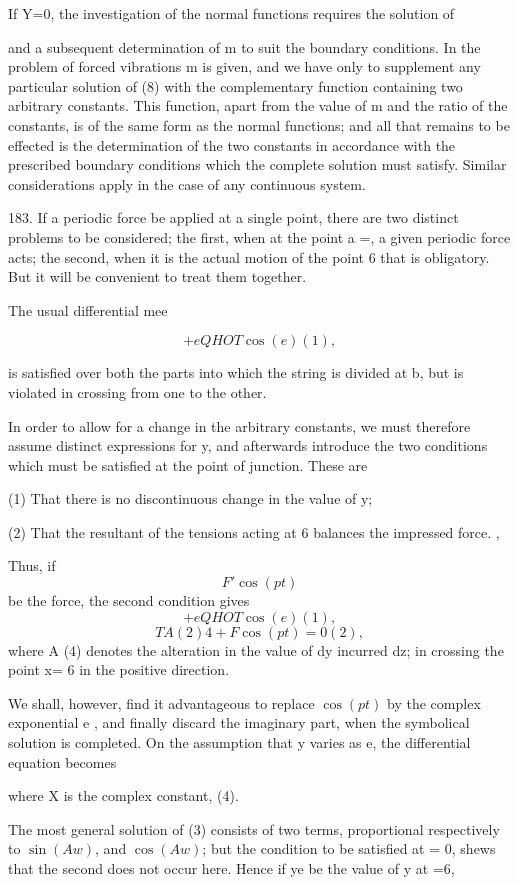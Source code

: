 If Y=0, the investigation of the normal functions requires the solution of

and a subsequent determination of m to suit the boundary conditions. In the
problem of forced vibrations m is given, and we have only to supplement any
particular solution of (8) with the complementary function containing two
arbitrary constants. This function, apart from the value of m and the ratio of
the constants, is of the same form as the normal functions; and all that
remains to be effected is the determination of the two constants in accordance
with the prescribed boundary conditions which the complete solution must
satisfy. Similar considerations apply in the case of any continuous system.

183. If a periodic force be applied at a single point, there are two distinct
problems to be considered; the first, when at the point a =, a given periodic
force acts; the second, when it is the actual motion of the point 6 that is
obligatory. But it will be convenient to treat them together.

The usual differential mee

\[+eQ HOT \cos(e) (1),\]

is satisfied over both the parts into which the string is divided at b, but is
violated in crossing from one to the other.

In order to allow for a change in the arbitrary constants, we must therefore
assume distinct expressions for y, and afterwards introduce the two conditions
which must be satisfied at the point of junction.  These are

(1) That there is no discontinuous change in the value of y;

(2) That the resultant of the tensions acting at 6 balances the impressed
force. ,

Thus, if
\[F' \cos(pt)\]
be the force, the second condition gives
\[+eQ HOT \cos(e) (1),\]
\[TA (2) 4+ F \cos(pt) = 0  (2),\]
where A (4) denotes the alteration in the value of dy incurred dz; in crossing
the point x= 6 in the positive direction.

We shall, however, find it advantageous to replace \(\cos(pt)\) by the complex
exponential e , and finally discard the imaginary part, when the symbolical
solution is completed. On the assumption that y varies as e, the differential
equation becomes

where X is the complex constant, (4).

The most general solution of (3) consists of two terms, proportional
respectively to \(\sin(Aw)\), and \(\cos(Aw)\); but the condition to be
satisfied at = 0, shews that the second does not occur here. Hence if ye be the
value of y at =6,

